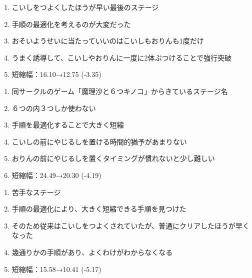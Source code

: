 \begin{enumerate}[label={\sarrow}]
\item こいしをつよくしたほうが早い最後のステージ
\item 手順の最適化を考えるのが大変だった
\item おそいようせいに当たっていいのはこいしもおりんも1度だけ
\item うまく誘導して、こいしやおりんに一度に2体ぶつけることで強行突破
\item 短縮幅：16.10→12.75 (-3.35)
\end{enumerate}



\clearpage
\begin{enumerate}[label={\sarrow}]
\item 同サークルのゲーム「魔理沙と６つキノコ」からきているステージ名
\item ６つの内３つしか使わない
\item 手順を最適化することで大きく短縮
\item こいしの前にやじるしを置ける時間的猶予があまりない
\item おりんの前にやじるしを置くタイミングが慣れないと少し難しい
\item 短縮幅：24.49→20.30 (-4.19)
\end{enumerate}



\begin{enumerate}[label={\sarrow}]
\item 苦手なステージ
\item 手順の最適化により、大きく短縮できる手順を見つけた
\item そのため従来はこいしをつよくされていたが、普通にクリアしたほうが早くなった
\item 幾通りかの手順があり、よくわけがわからなくなる
\item 短縮幅：15.58→10.41 (-5.17)
\end{enumerate}



